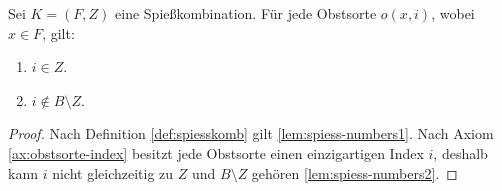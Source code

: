 \begin{lemma} \label{lem:spiess-numbers}
Sei $K = (F, Z)$ eine Spießkombination. Für jede Obstsorte $o(x, i)$, wobei $x \in F$, gilt:
\begin{enumerate}[label={\upshape(\roman*)}]
  \item $i \in Z$. \label{lem:spiess-numbers1}
  \item $i \notin B \setminus Z$. \label{lem:spiess-numbers2}
\end{enumerate}   
\end{lemma}

\begin{proof}
Nach Definition \ref{def:spiesskomb} gilt \ref{lem:spiess-numbers1}. 
Nach Axiom \ref{ax:obstsorte-index} besitzt jede Obstsorte einen einzigartigen Index $i$,
deshalb kann $i$ nicht gleichzeitig zu $Z$ und $B \setminus Z$ gehören \ref{lem:spiess-numbers2}.
\end{proof}